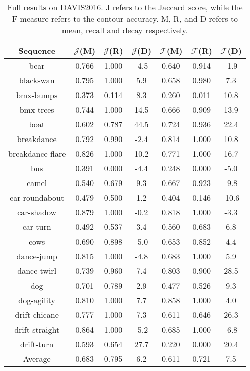 \begin{table}[!htb]
\footnotesize
\centering
\begin{tabular}{c|ccc|ccc}

Sequence&$\mathcal{J}$(M)&$\mathcal{J}$(R)&$\mathcal{J}$(D)&$\mathcal{F}$(M)&$\mathcal{F}$(R)&$\mathcal{F}$(D)\\ \hline
bear& 0.766& 1.000&-4.5& 0.640& 0.914&-1.9\\
blackswan& 0.795& 1.000& 5.9& 0.658& 0.980& 7.3\\
bmx-bumps& 0.373& 0.114& 8.3& 0.260& 0.011& 10.8\\
bmx-trees& 0.744& 1.000& 14.5& 0.666& 0.909& 13.9\\
boat& 0.602& 0.787& 44.5& 0.724& 0.936& 22.4\\
breakdance& 0.792& 0.990&-2.4& 0.814& 1.000& 10.8\\
breakdance-flare& 0.826& 1.000& 10.2& 0.771& 1.000& 16.7\\
bus& 0.391& 0.000&-4.4& 0.248& 0.000&-5.0\\
camel& 0.540& 0.679& 9.3& 0.667& 0.923&-9.8\\
car-roundabout& 0.479& 0.500& 1.2& 0.404& 0.146&-10.6\\
car-shadow& 0.879& 1.000&-0.2& 0.818& 1.000&-3.3\\
car-turn& 0.492& 0.537& 3.4& 0.560& 0.683& 6.8\\
cows& 0.690& 0.898&-5.0& 0.653& 0.852& 4.4\\
dance-jump& 0.815& 1.000&-4.8& 0.683& 1.000& 5.9\\
dance-twirl& 0.739& 0.960& 7.4& 0.803& 0.900&28.5\\
dog& 0.701& 0.789& 2.9& 0.477& 0.526& 9.3\\
dog-agility& 0.810& 1.000& 7.7& 0.858& 1.000& 4.0\\
drift-chicane& 0.777& 1.000& 7.3& 0.611& 0.646& 26.3\\
drift-straight& 0.864& 1.000&-5.2& 0.685& 1.000&-6.8\\
drift-turn& 0.593& 0.654& 27.7& 0.220& 0.000& 20.4\\ \hline
Average& 0.683& 0.795& 6.2 & 0.611& 0.721& 7.5  \\ 
\end{tabular}
\caption{Full results on DAVIS2016. J refers to the Jaccard score, while the F-measure refers to the contour accuracy. M, R, and D refers to mean, recall and decay respectively.}
\label{tab:davis}
\end{table}



